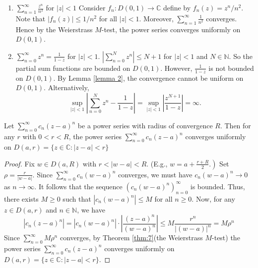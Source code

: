 \documentclass[a4paper,11pt]{article}
\begin{document}
\begin{example}
\begin{enumerate}
    \item $\sum_{n=1}^{\infty} \frac{z^{n}}{n^{2}}$ for $|z|<1$
    Consider $f_{n}: D(0,1) \rightarrow \mathbb{C}$ define by $f_{n}(z)=z^{n} / n^{2}$. Note that $\left|f_{n}(z)\right| \leqslant 1 / n^{2}$ for all $|z|<1$. Moreover, $\sum_{n=1}^{\infty} \frac{1}{n^{2}}$ converges. Hence by the Weierstrass $M$-test, the power series converges uniformly on $D(0,1)$.
    
    \item $\sum_{n=0}^{\infty} z^{n}=\frac{1}{1-z}$ for $|z|<1$.
    $\left|\sum_{n=0}^{N} z^{n}\right| \leqslant N+1$ for $|z|<1$ and $N \in \mathbb{N} .$ So the partial sum functions are bounded on $D(0,1)$. However, $\frac{1}{1-z}$ is not bounded on $D(0,1)$. By Lemma \ref{lemma 2}, the convergence cannot be uniform on $D(0,1)$.
    Alternatively,
    \[
    \sup _{|z|<1}\left|\sum_{n=0}^{N} z^{n}-\frac{1}{1-z}\right|=\sup _{|z|<1}\left|\frac{z^{N+1}}{1-z}\right|=\infty.
    \]
\end{enumerate}
\end{example}
\begin{theorem}\label{thm:8}
    Let $\sum_{n=0}^{\infty} c_{n}(z-a)^{n}$ be a power series with radius of convergence $R$. Then for any $r$ with $0<r<R$, the power series $\sum_{n=0}^{\infty} c_{n}(z-a)^{n}$ converges uniformly on $D(a, r)=\{z \in \mathbb{C}:|z-a|<r\}$
\end{theorem}
\begin{proof}
    Fix $w \in D(a, R)$ with $r<|w-a|<R$. (E.g., $\left.w=a+\frac{r+R}{2} .\right)$ Set $\rho=\frac{r}{|w-a|}$. Since $\sum_{n=0}^{\infty} c_{n}(w-a)^{n}$ converges, we must have $c_{n}(w-a)^{n} \rightarrow 0$ as $n \rightarrow \infty$. It follows that the sequence $\left(c_{n}(w-a)^{n}\right)_{n=0}^{\infty}$ is bounded. Thus, there exists $M \geqslant 0$ such that $\left|c_{n}(w-a)^{n}\right| \leqslant M$ for all $n \geqslant 0$. Now, for any $z \in D(a, r)$ and $n \in \mathbb{N}$, we have
    \[
    \left|c_{n}(z-a)^{n}\right|=\left|c_{n}(w-a)^{n}\right| \cdot\left|\frac{(z-a)^{n}}{(w-a)^{n}}\right| \leqslant M \frac{r^{n}}{|(w-a)|^{n}}=M \rho^{n}
    \]
    Since $\sum_{n=0}^{\infty} M \rho^{n}$ converges, by Theorem \ref{thm:7}(the Weierstrass $M$-test) the power series $\sum_{n=0}^{\infty} c_{n}(z-a)^{n}$ converges uniformly on $D(a, r)=\{z \in \mathbb{C}:|z-a|<r\}$.
\end{proof}
\end{document}
